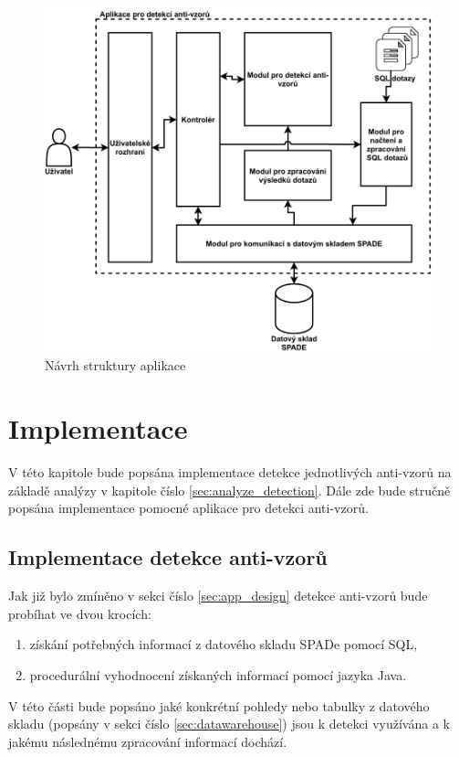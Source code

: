 \documentclass[czech,DP]{thesiskiv}
\begin{document}
\begin{figure}[!htb]
    \centering
    \includegraphics[width=400pt]{img/app_structure.pdf}
    \caption{Návrh struktury aplikace}
    \label{img:app_structure}
\end{figure}
\FloatBarrier
\chapter{Implementace}
V této kapitole bude popsána implementace detekce jednotlivých anti-vzorů na základě analýzy v kapitole číslo \ref{sec:analyze_detection}. Dále zde bude stručně popsána implementace pomocné aplikace pro detekci anti-vzorů.
\section{Implementace detekce anti-vzorů}
Jak již bylo zmíněno v sekci číslo \ref{sec:app_design} detekce anti-vzorů bude probíhat ve dvou krocích:
\begin{enumerate}
    \item získání potřebných informací z datového skladu SPADe pomocí SQL,
    \item procedurální vyhodnocení získaných informací pomocí jazyka Java.
\end{enumerate}
V této části bude popsáno jaké konkrétní pohledy nebo tabulky z datového skladu (popsány v sekci číslo \ref{sec:datawarehouse}) jsou k detekci využívána a k jakému následnému zpracování informací dochází.
\end{document}
